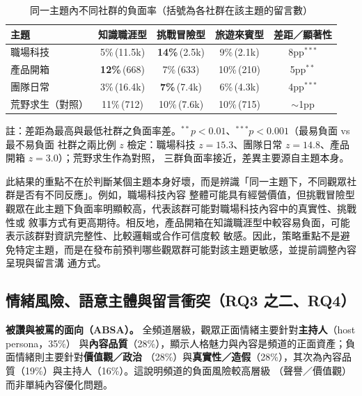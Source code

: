 \begin{table}[H]
\centering
\caption{同一主題內不同社群的負面率（括號為各社群在該主題的留言數）}
\label{tab:sensitivity}
\small
\begin{tabular}{l ccc c}
\toprule
\textbf{主題} & \textbf{知識職涯型} & \textbf{挑戰冒險型} & \textbf{旅遊來賓型} & \textbf{差距／顯著性}\\
\midrule
職場科技 & 5\%\,{\scriptsize(11.5k)} & \textbf{14\%}\,{\scriptsize(2.5k)} & 9\%\,{\scriptsize(2.1k)} & 8pp$^{***}$ \\
產品開箱 & \textbf{12\%}\,{\scriptsize(668)} & 7\%\,{\scriptsize(633)} & 10\%\,{\scriptsize(210)} & 5pp$^{**}$ \\
團隊日常 & 3\%\,{\scriptsize(16.4k)} & \textbf{7\%}\,{\scriptsize(7.4k)} & 6\%\,{\scriptsize(4.3k)} & 4pp$^{***}$ \\
\midrule
荒野求生（對照） & 11\%\,{\scriptsize(712)} & 10\%\,{\scriptsize(7.6k)} & 10\%\,{\scriptsize(715)} & $\sim$1pp \\
\bottomrule
\end{tabular}

\vspace{2pt}
{\footnotesize 註：差距為最高與最低社群之負面率差。$^{**}p<0.01$、$^{***}p<0.001$（最易負面 vs 最不易負面
社群之兩比例 $z$ 檢定：職場科技 $z{=}15.3$、團隊日常 $z{=}14.8$、產品開箱 $z{=}3.0$）；荒野求生作為對照，
三群負面率接近，差異主要源自主題本身。}
\end{table}

此結果的重點不在於判斷某個主題本身好壞，而是辨識「同一主題下，不同觀眾社群是否有不同反應」。例如，職場科技內容
整體可能具有經營價值，但挑戰冒險型觀眾在此主題下負面率明顯較高，代表該群可能對職場科技內容中的真實性、挑戰性或
敘事方式有更高期待。相反地，產品開箱在知識職涯型中較容易負面，可能表示該群對資訊完整性、比較邏輯或合作可信度較
敏感。因此，策略重點不是避免特定主題，而是在發布前預判哪些觀眾群可能對該主題更敏感，並提前調整內容呈現與留言溝
通方式。

\subsection{情緒風險、語意主體與留言衝突（RQ3 之二、RQ4）}
\label{sec:case-risk}

\textbf{被讚與被罵的面向（ABSA）。} 全頻道層級，觀眾正面情緒主要針對\textbf{主持人}（host persona，35\%）
與\textbf{內容品質}（28\%），顯示人格魅力與內容是頻道的正面資產；負面情緒則主要針對\textbf{價值觀／政治}
（28\%）與\textbf{真實性／造假}（28\%），其次為內容品質（19\%）與主持人（16\%）。這說明頻道的負面風險較高層級
（聲譽／價值觀）而非單純內容優化問題。

